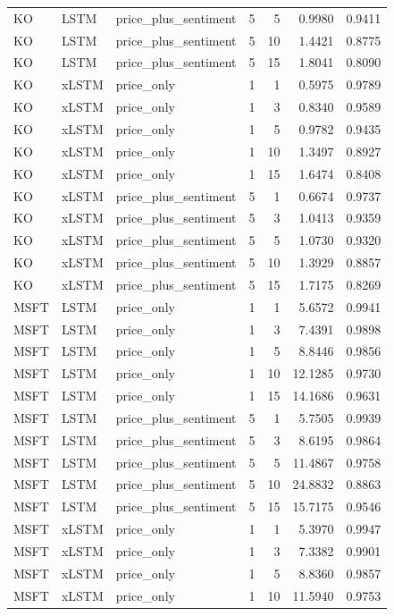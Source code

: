 \begin{longtable}{lllrrrr}
KO & LSTM & price_plus_sentiment & 5 & 5 & 0.9980 & 0.9411 \\
KO & LSTM & price_plus_sentiment & 5 & 10 & 1.4421 & 0.8775 \\
KO & LSTM & price_plus_sentiment & 5 & 15 & 1.8041 & 0.8090 \\
KO & xLSTM & price_only & 1 & 1 & 0.5975 & 0.9789 \\
KO & xLSTM & price_only & 1 & 3 & 0.8340 & 0.9589 \\
KO & xLSTM & price_only & 1 & 5 & 0.9782 & 0.9435 \\
KO & xLSTM & price_only & 1 & 10 & 1.3497 & 0.8927 \\
KO & xLSTM & price_only & 1 & 15 & 1.6474 & 0.8408 \\
KO & xLSTM & price_plus_sentiment & 5 & 1 & 0.6674 & 0.9737 \\
KO & xLSTM & price_plus_sentiment & 5 & 3 & 1.0413 & 0.9359 \\
KO & xLSTM & price_plus_sentiment & 5 & 5 & 1.0730 & 0.9320 \\
KO & xLSTM & price_plus_sentiment & 5 & 10 & 1.3929 & 0.8857 \\
KO & xLSTM & price_plus_sentiment & 5 & 15 & 1.7175 & 0.8269 \\
MSFT & LSTM & price_only & 1 & 1 & 5.6572 & 0.9941 \\
MSFT & LSTM & price_only & 1 & 3 & 7.4391 & 0.9898 \\
MSFT & LSTM & price_only & 1 & 5 & 8.8446 & 0.9856 \\
MSFT & LSTM & price_only & 1 & 10 & 12.1285 & 0.9730 \\
MSFT & LSTM & price_only & 1 & 15 & 14.1686 & 0.9631 \\
MSFT & LSTM & price_plus_sentiment & 5 & 1 & 5.7505 & 0.9939 \\
MSFT & LSTM & price_plus_sentiment & 5 & 3 & 8.6195 & 0.9864 \\
MSFT & LSTM & price_plus_sentiment & 5 & 5 & 11.4867 & 0.9758 \\
MSFT & LSTM & price_plus_sentiment & 5 & 10 & 24.8832 & 0.8863 \\
MSFT & LSTM & price_plus_sentiment & 5 & 15 & 15.7175 & 0.9546 \\
MSFT & xLSTM & price_only & 1 & 1 & 5.3970 & 0.9947 \\
MSFT & xLSTM & price_only & 1 & 3 & 7.3382 & 0.9901 \\
MSFT & xLSTM & price_only & 1 & 5 & 8.8360 & 0.9857 \\
MSFT & xLSTM & price_only & 1 & 10 & 11.5940 & 0.9753 \\

\end{longtable}
